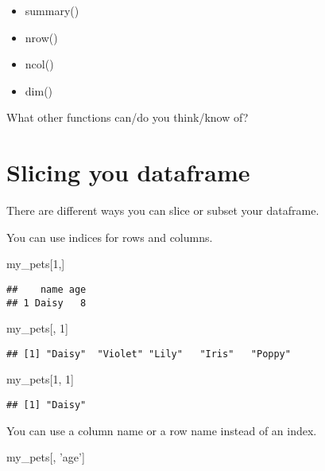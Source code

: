 \documentclass[]{book}
\newenvironment{Shaded}{\begin{snugshade}}{\end{snugshade}}
\newcommand{\DecValTok}[1]{\textcolor[rgb]{0.00,0.00,0.81}{#1}}
\newcommand{\NormalTok}[1]{#1}
\newcommand{\StringTok}[1]{\textcolor[rgb]{0.31,0.60,0.02}{#1}}
\begin{document}
\begin{itemize}
\item
  summary()
\item
  nrow()
\item
  ncol()
\item
  dim()
\end{itemize}

What other functions can/do you think/know of?

\hypertarget{slicing-you-dataframe}{%
\section{Slicing you dataframe}\label{slicing-you-dataframe}}

There are different ways you can slice or subset your dataframe.

You can use indices for rows and columns.

\begin{Shaded}
\begin{Highlighting}[]
\NormalTok{my_pets[}\DecValTok{1}\NormalTok{,]}
\end{Highlighting}
\end{Shaded}

\begin{verbatim}
##    name age
## 1 Daisy   8
\end{verbatim}

\begin{Shaded}
\begin{Highlighting}[]
\NormalTok{my_pets[, }\DecValTok{1}\NormalTok{]}
\end{Highlighting}
\end{Shaded}

\begin{verbatim}
## [1] "Daisy"  "Violet" "Lily"   "Iris"   "Poppy"
\end{verbatim}

\begin{Shaded}
\begin{Highlighting}[]
\NormalTok{my_pets[}\DecValTok{1}\NormalTok{, }\DecValTok{1}\NormalTok{]}
\end{Highlighting}
\end{Shaded}

\begin{verbatim}
## [1] "Daisy"
\end{verbatim}

You can use a column name or a row name instead of an index.

\begin{Shaded}
\begin{Highlighting}[]
\NormalTok{my_pets[, }\StringTok{'age'}\NormalTok{]}
\end{Highlighting}
\end{Shaded}
\end{document}
